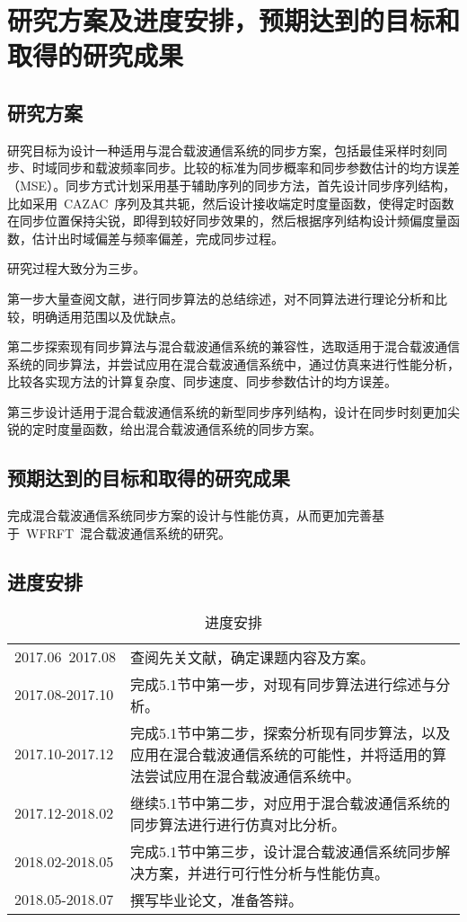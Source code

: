 
\section{研究方案及进度安排，预期达到的目标和取得的研究成果}
\subsection{研究方案}
研究目标为设计一种适用与混合载波通信系统的同步方案，包括最佳采样时刻同步、时域同步和载波频率同步。比较的标准为同步概率和同步参数估计的均方误差（MSE）。同步方式计划采用基于辅助序列的同步方法，首先设计同步序列结构，比如采用~CAZAC~序列及其共轭，然后设计接收端定时度量函数，使得定时函数在同步位置保持尖锐，即得到较好同步效果的，然后根据序列结构设计频偏度量函数，估计出时域偏差与频率偏差，完成同步过程。

研究过程大致分为三步。

第一步大量查阅文献，进行同步算法的总结综述，对不同算法进行理论分析和比较，明确适用范围以及优缺点。

第二步探索现有同步算法与混合载波通信系统的兼容性，选取适用于混合载波通信系统的同步算法，并尝试应用在混合载波通信系统中，通过仿真来进行性能分析，比较各实现方法的计算复杂度、同步速度、同步参数估计的均方误差。

第三步设计适用于混合载波通信系统的新型同步序列结构，设计在同步时刻更加尖锐的定时度量函数，给出混合载波通信系统的同步方案。

\subsection{预期达到的目标和取得的研究成果}
完成混合载波通信系统同步方案的设计与性能仿真，从而更加完善基于~WFRFT~混合载波通信系统的研究。

\subsection{进度安排}
\begin{table}[htbp]
\centering
\caption{进度安排}\label{table3}\vspace{-0.5em}
\begin{tabularx}{0.8\textwidth}{lX}
\toprule
2017.06~2017.08 & 查阅先关文献，确定课题内容及方案。\\
2017.08-2017.10 & 完成5.1节中第一步，对现有同步算法进行综述与分析。\\
2017.10-2017.12	& 完成5.1节中第二步，探索分析现有同步算法，以及应用在混合载波通信系统的可能性，并将适用的算法尝试应用在混合载波通信系统中。\\
2017.12-2018.02 & 继续5.1节中第二步，对应用于混合载波通信系统的同步算法进行进行仿真对比分析。\\
2018.02-2018.05 & 完成5.1节中第三步，设计混合载波通信系统同步解决方案，并进行可行性分析与性能仿真。\\
2018.05-2018.07 & 撰写毕业论文，准备答辩。\\
\bottomrule
\end{tabularx}
\end{table}


